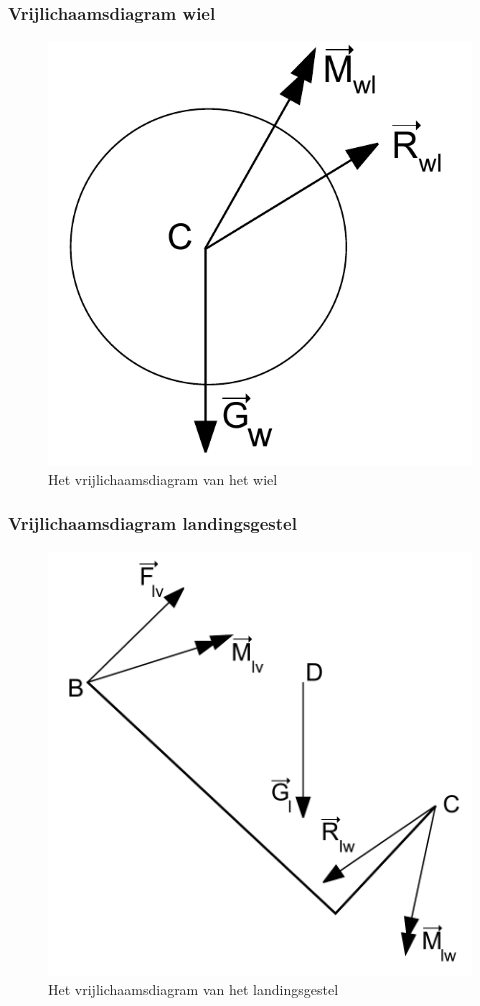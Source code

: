 \subsubsection{Vrijlichaamsdiagram wiel}
\begin{figure}[h!]
\centering
\includegraphics[scale=0.5]{Vrijlichaamsdiagram_wiel}
\caption{Het vrijlichaamsdiagram van het wiel}
\end{figure}

\subsubsection{Vrijlichaamsdiagram landingsgestel}
\begin{figure}[h!]
\centering
\includegraphics[scale=0.5]{Vrijlichaamsdiagram_landing}
\caption{Het vrijlichaamsdiagram van het landingsgestel}
\end{figure}